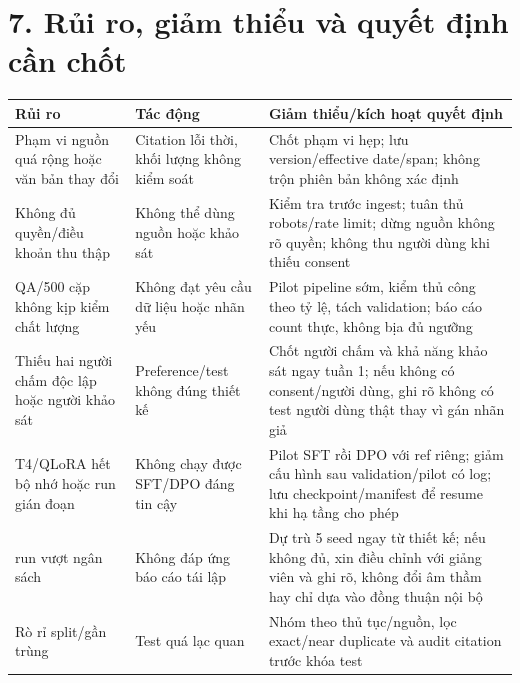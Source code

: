 \documentclass[11pt,a4paper]{article}
\begin{document}
\section{7. Rủi ro, giảm thiểu và quyết định cần
chốt}\label{rux1ee7i-ro-giux1ea3m-thiux1ec3u-vuxe0-quyux1ebft-ux111ux1ecbnh-cux1ea7n-chux1ed1t}

{\def\LTcaptype{none} %
\begin{longtable}[]{@{}
  >{\raggedright\arraybackslash}p{}
  >{\raggedright\arraybackslash}p{}
  >{\raggedright\arraybackslash}p{}@{}}
\toprule\noalign{}
\begin{minipage}[b]{\linewidth}\raggedright
Rủi ro
\end{minipage} & \begin{minipage}[b]{\linewidth}\raggedright
Tác động
\end{minipage} & \begin{minipage}[b]{\linewidth}\raggedright
Giảm thiểu/kích hoạt quyết định
\end{minipage} \\
\midrule\noalign{}
\endhead
\bottomrule\noalign{}
\endlastfoot
Phạm vi nguồn quá rộng hoặc văn bản thay đổi & Citation lỗi thời, khối
lượng không kiểm soát & Chốt phạm vi hẹp; lưu version/effective
date/span; không trộn phiên bản không xác định \\
Không đủ quyền/điều khoản thu thập & Không thể dùng nguồn hoặc khảo sát
& Kiểm tra trước ingest; tuân thủ robots/rate limit; dừng nguồn không rõ
quyền; không thu người dùng khi thiếu consent \\
2.000 QA/500 cặp không kịp kiểm chất lượng & Không đạt yêu cầu dữ liệu
hoặc nhãn yếu & Pilot pipeline sớm, kiểm thủ công theo tỷ lệ, tách
validation; báo cáo count thực, không bịa đủ ngưỡng \\
Thiếu hai người chấm độc lập hoặc người khảo sát & Preference/test không
đúng thiết kế & Chốt người chấm và khả năng khảo sát ngay tuần 1; nếu
không có consent/người dùng, ghi rõ không có test người dùng thật thay
vì gán nhãn giả \\
T4/QLoRA hết bộ nhớ hoặc run gián đoạn & Không chạy được SFT/DPO đáng
tin cậy & Pilot SFT rồi DPO với ref riêng; giảm cấu hình sau
validation/pilot có log; lưu checkpoint/manifest để resume khi hạ tầng
cho phép \\
5 run vượt ngân sách & Không đáp ứng báo cáo tái lập & Dự trù 5 seed
ngay từ thiết kế; nếu không đủ, xin điều chỉnh với giảng viên và ghi rõ,
không đổi âm thầm hay chỉ dựa vào đồng thuận nội bộ \\
Rò rỉ split/gần trùng & Test quá lạc quan & Nhóm theo thủ tục/nguồn, lọc
exact/near duplicate và audit citation trước khóa test \\
\end{longtable}
}
\end{document}
